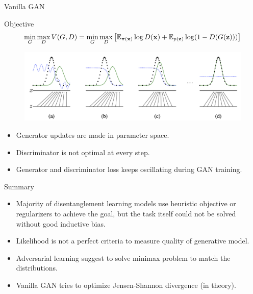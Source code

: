 \begin{frame}{Vanilla GAN}
	\begin{block}{Objective}
		\vspace{-0.4cm}
		\[
		\min_{G} \max_D V(G, D) = \min_{G} \max_D \left[ \mathbb{E}_{\pi(\mathbf{x})} \log D(\mathbf{x}) + \mathbb{E}_{p(\mathbf{z})} \log (1 - D(G(\mathbf{z}))) \right]
		\]
		\vspace{-0.4cm}
	\end{block}

	\begin{figure}
		\centering
		\includegraphics[width=1.0\linewidth]{figs/gan_1}
	\end{figure}
	\begin{itemize}
		\item Generator updates are made in parameter space.
		\item Discriminator is not optimal at every step.
		\item Generator and discriminator loss keeps oscillating during GAN training.
	\end{itemize}

\end{frame}
\begin{frame}{Summary}
	\begin{itemize}
		\item Majority of disentanglement learning models use heuristic objective or regularizers to achieve the goal, but the task itself could not be solved without good inductive bias.
		\vfill
		\item Likelihood is not a perfect criteria to measure quality of generative model.
		\vfill
		\item Adversarial learning suggest to solve minimax problem to match the distributions.
		\vfill
		\item Vanilla GAN tries to optimize Jensen-Shannon divergence (in theory).
	\end{itemize}
\end{frame}
 